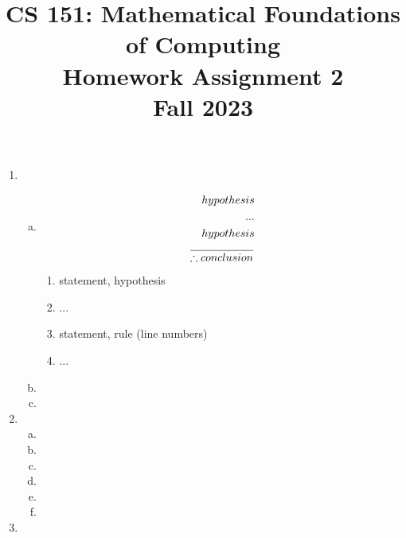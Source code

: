 \documentclass[14pt]{extarticle} %
\title{CS 151: Mathematical Foundations of Computing \\ Homework Assignment 2 \\ 
Fall 2023}
\date{}
\begin{document}
\maketitle %
\vspace{-0.75in} %

\begin{enumerate} %

    \item
    \begin{enumerate}[a.]
        \item %
        \begin{align*} 
          hypothesis \\
          ... \\
          hypothesis \\
          \over \therefore conclusion
        \end{align*}
        \begin{enumerate}[1.]
            \item statement, hypothesis 
            \item ...
            \item statement, rule (line numbers)
            \item ...
        \end{enumerate}
        
        \item %

        \item %

    \end{enumerate} %

    \item
    \begin{enumerate}[a.]
        \item %

        \item %

        \item %
        
        \item %

        \item %
        
        \item %
        
    \end{enumerate}
    

    \item



    
\end{enumerate}
\end{document}

